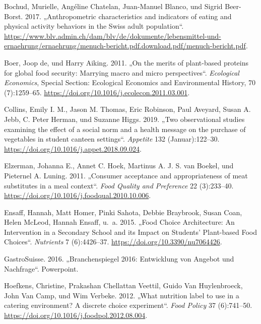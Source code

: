 \documentclass[12pt,ngerman,]{article}
\begin{document}
\leavevmode\hypertarget{ref-bochud_anthropometric_2017}{}%
Bochud, Murielle, Angéline Chatelan, Juan-Manuel Blanco, und Sigrid
Beer-Borst. 2017. „Anthropometric characteristics and indicators of
eating and physical activity behaviors in the Swiss adult population``.
\url{https://www.blv.admin.ch/dam/blv/de/dokumente/lebensmittel-und-ernaehrung/ernaehrung/menuch-bericht.pdf.download.pdf/menuch-bericht.pdf}.

\leavevmode\hypertarget{ref-de_boer_merits_2011}{}%
Boer, Joop de, und Harry Aiking. 2011. „On the merits of plant-based
proteins for global food security: Marrying macro and micro
perspectives``. \emph{Ecological Economics}, Special Section: Ecological
Economics and Environmental History, 70 (7):1259--65.
\url{https://doi.org/10.1016/j.ecolecon.2011.03.001}.

\leavevmode\hypertarget{ref-collins_two_2019}{}%
Collins, Emily I. M., Jason M. Thomas, Eric Robinson, Paul Aveyard,
Susan A. Jebb, C. Peter Herman, und Suzanne Higgs. 2019. „Two
observational studies examining the effect of a social norm and a health
message on the purchase of vegetables in student canteen settings``.
\emph{Appetite} 132 (Januar):122--30.
\url{https://doi.org/10.1016/j.appet.2018.09.024}.

\leavevmode\hypertarget{ref-elzerman_consumer_2011}{}%
Elzerman, Johanna E., Annet C. Hoek, Martinus A. J. S. van Boekel, und
Pieternel A. Luning. 2011. „Consumer acceptance and appropriateness of
meat substitutes in a meal context``. \emph{Food Quality and Preference}
22 (3):233--40. \url{https://doi.org/10.1016/j.foodqual.2010.10.006}.

\leavevmode\hypertarget{ref-ensaff_food_2015}{}%
Ensaff, Hannah, Matt Homer, Pinki Sahota, Debbie Braybrook, Susan Coan,
Helen McLeod, Hannah Ensaff, u.~a. 2015. „Food Choice Architecture: An
Intervention in a Secondary School and its Impact on Students'
Plant-based Food Choices``. \emph{Nutrients} 7 (6):4426--37.
\url{https://doi.org/10.3390/nu7064426}.

\leavevmode\hypertarget{ref-gastrosuisse_branchenspiegel_2016}{}%
GastroSuisse. 2016. „Branchenspiegel 2016: Entwicklung von Angebot und
Nachfrage``. Powerpoint.

\leavevmode\hypertarget{ref-hoefkens_what_2012}{}%
Hoefkens, Christine, Prakashan Chellattan Veettil, Guido Van
Huylenbroeck, John Van Camp, und Wim Verbeke. 2012. „What nutrition
label to use in a catering environment? A discrete choice experiment``.
\emph{Food Policy} 37 (6):741--50.
\url{https://doi.org/10.1016/j.foodpol.2012.08.004}.
\end{document}
